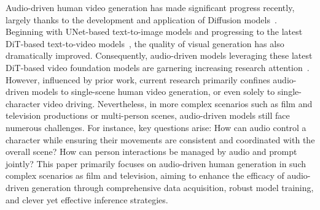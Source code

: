 Audio-driven human video generation has made significant progress recently, largely thanks to the development and application of Diffusion models~\cite{ddpm}. Beginning with UNet-based text-to-image models and progressing to the latest DiT-based text-to-video models~\cite{wan2025,hunyuanvideo}, the quality of visual generation has also dramatically improved. Consequently, audio-driven models leveraging these latest DiT-based video foundation models are garnering increasing research attention~\cite{ominihuman,hu2025HunyuanVideo-Avatar,Wang2025FantasyTalkingRT}. However, influenced by prior work, current research primarily confines audio-driven models to single-scene human video generation, or even solely to single-character video driving. Nevertheless, in more complex scenarios such as film and television productions or multi-person scenes, audio-driven models still face numerous challenges. For instance, key questions arise: How can audio control a character while ensuring their movements are consistent and coordinated with the overall scene? How can person interactions be managed by audio and prompt jointly?
This paper primarily focuses on audio-driven human generation in such complex scenarios as film and television, aiming to enhance the efficacy of audio-driven generation through comprehensive data acquisition, robust model training, and clever yet effective inference strategies.

